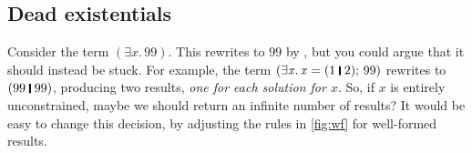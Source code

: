 \documentclass[acmsmall,review,anonymous,dvipsnames]{acmart}
\newcommand{\Varid}[1]{\mathit{#1}}
\newcommand{\eg}{\emph{e.g.}}
\begin{document}
%
%


%

\subsection{Dead existentials}

Consider the term \ensuremath{(\exists\Varid{x}.\,\mathrm{99})}. This rewrites to \ensuremath{\mathrm{99}} by , but you could
argue that it should instead be stuck.
For example, the term
\ensuremath{(\exists\Varid{x}.\,\Varid{x}\mathrel{=}(\mathrm{1}\;\rule[-0.3mm]{0.5mm}{2.5mm}\;\mathrm{2});\,\mathrm{99})} rewrites to \ensuremath{(\mathrm{99}\;\rule[-0.3mm]{0.5mm}{2.5mm}\;\mathrm{99})}, producing two results, \emph{one for each
  solution for \ensuremath{\Varid{x}}}.  So, if \ensuremath{\Varid{x}} is entirely unconstrained, maybe we should return an infinite number of results?
It would be easy to change this decision, by adjusting the rules in \cref{fig:wf} for well-formed results.
\end{document}

